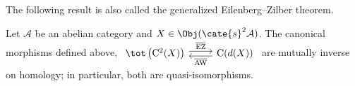 The following result is also called the generalized Eilenberg--Zilber theorem.

\begin{theorem}\label{prop:Eilenberg-Zilber}
	Let $\mathcal{A}$ be an abelian category and
	$X\in\Obj(\cate{s}^2\mathcal{A})$. The canonical morphisms defined above,
	$\begin{tikzcd}
		\tot \left(\mathrm{C}^2(X)\right) \arrow[shift left, r, "\overline{\mathrm{EZ}}"] & \mathrm{C}(d(X)) \arrow[shift left, l, "\overline{\mathrm{AW}}"]
	\end{tikzcd}$
	are mutually inverse on homology; in particular, both are
	quasi-isomorphisms.
\end{theorem}
